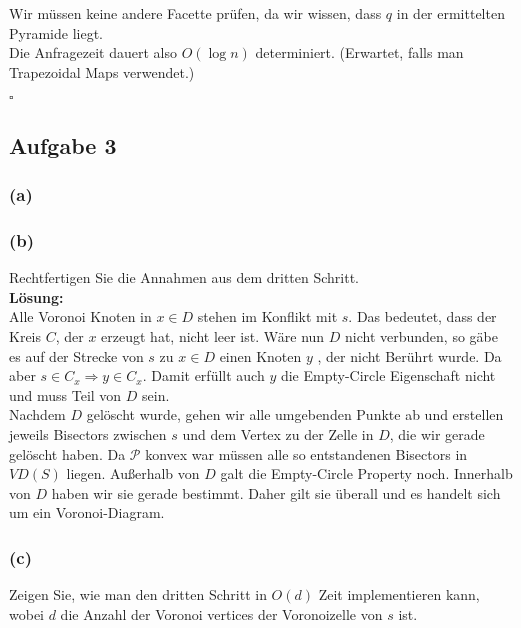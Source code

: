 \documentclass[11pt,a4paper,ngerman]{article}
\begin{document}
Wir müssen keine andere Facette prüfen, da wir wissen, dass $q$ in der ermittelten Pyramide liegt.\\

Die Anfragezeit dauert also $O(\log n)$ determiniert. (Erwartet, falls man Trapezoidal Maps verwendet.)

\mbox{}\hfill$\square$

\subsection*{Aufgabe 3}

\subsubsection*{(a)}

\vspace{7cm}

\subsubsection*{(b)}

Rechtfertigen Sie die Annahmen aus dem dritten Schritt.\\

\textbf{Lösung:}\\

Alle Voronoi Knoten in $x \in D$ stehen im Konflikt mit $s$. Das bedeutet, dass der Kreis $C$, der $x$ erzeugt hat,
nicht leer ist. Wäre nun $D$ nicht verbunden, so gäbe es auf der Strecke von $s$ zu $x \in D$ einen Knoten $y$ , der nicht
Berührt wurde. Da aber $s \in C_x \Rightarrow y \in C_x$. Damit erfüllt auch $y$ die Empty-Circle Eigenschaft nicht und
muss Teil von $D$ sein.\\

Nachdem $D$ gelöscht wurde, gehen wir alle umgebenden Punkte ab und erstellen jeweils Bisectors zwischen $s$ und dem Vertex
zu der Zelle in $D$, die wir gerade gelöscht haben. Da $\mathcal{P}$ konvex war müssen alle so entstandenen Bisectors in $VD(S)$ liegen.
Außerhalb von $D$ galt die Empty-Circle Property noch. Innerhalb von $D$ haben wir sie gerade bestimmt. Daher gilt sie überall
und es handelt sich um ein Voronoi-Diagram.

\subsubsection*{(c)}

Zeigen Sie, wie man den dritten Schritt in $O(d)$ Zeit implementieren kann, wobei $d$ die Anzahl der Voronoi vertices der Voronoizelle von $s$ ist.\\
\end{document}
